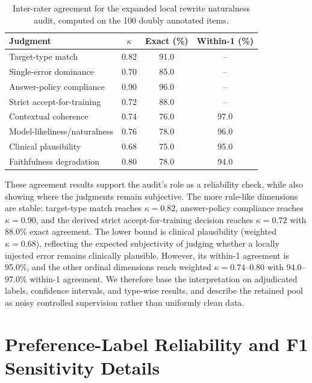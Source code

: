 \documentclass[a4paper,fleqn,doubleblind]{cas-sc}
\begin{document}
\begin{table}[htbp]
    \centering
    \caption{Inter-rater agreement for the expanded local rewrite naturalness audit, computed on the 100 doubly annotated items.}
    \label{tab:ordinal_agreement}
    \begin{tabular}{lccc}
        \toprule
        \textbf{Judgment} & \textbf{$\kappa$} & \textbf{Exact (\%)} & \textbf{Within-1 (\%)} \\
        \midrule
        Target-type match & 0.82 & 91.0 & -- \\
        Single-error dominance & 0.70 & 85.0 & -- \\
        Answer-policy compliance & 0.90 & 96.0 & -- \\
        Strict accept-for-training & 0.72 & 88.0 & -- \\
        Contextual coherence & 0.74 & 76.0 & 97.0 \\
        Model-likeliness/naturalness & 0.76 & 78.0 & 96.0 \\
        Clinical plausibility & 0.68 & 75.0 & 95.0 \\
        Faithfulness degradation & 0.80 & 78.0 & 94.0 \\
        \bottomrule
\end{tabular}
\end{table}

These agreement results support the audit's role as a reliability check, while also showing where the judgments remain subjective. The more rule-like dimensions are stable: target-type match reaches $\kappa=0.82$, answer-policy compliance reaches $\kappa=0.90$, and the derived strict accept-for-training decision reaches $\kappa=0.72$ with 88.0\% exact agreement. The lower bound is clinical plausibility (weighted $\kappa=0.68$), reflecting the expected subjectivity of judging whether a locally injected error remains clinically plausible. However, its within-1 agreement is 95.0\%, and the other ordinal dimensions reach weighted $\kappa=0.74$--0.80 with 94.0--97.0\% within-1 agreement. We therefore base the interpretation on adjudicated labels, confidence intervals, and type-wise results, and describe the retained pool as noisy controlled supervision rather than uniformly clean data.

\section{Preference-Label Reliability and F1 Sensitivity Details}
\label{app:preference_label_details}
\end{document}
